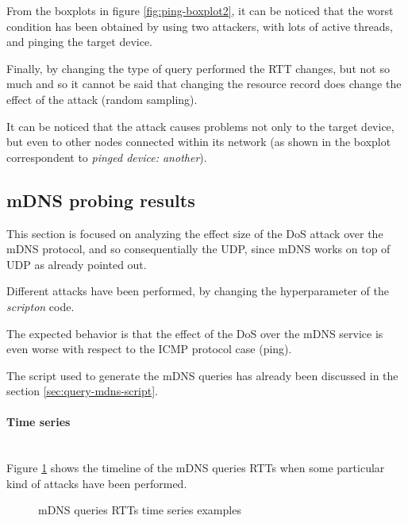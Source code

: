 \documentclass[fleqn, 11pt]{SelfArx} %
\begin{document}
From the boxplots in figure \ref{fig:ping-boxplot2}, it can be noticed that the worst condition has been obtained by using two attackers, with lots of active threads, and pinging the target device.

Finally, by changing the type of query performed the RTT changes, but not so much and so it cannot be said that changing the resource record does change the effect of the attack (random sampling).

It can be noticed that the attack causes problems not only to the target device, but even to other nodes connected within its network  (as shown in the boxplot correspondent to {\it{pinged device: another}}).
\subsection{mDNS probing results}
This section is focused on analyzing the effect size of the DoS attack over the mDNS protocol, and so consequentially the UDP, since mDNS works on top of UDP as already pointed out.

Different attacks have been performed, by changing the hyperparameter of the {\it{scripton}} code.

The expected behavior is that the effect of the DoS over the mDNS service is even worse with respect to the ICMP protocol case (ping).

The script used to generate the mDNS queries has already been discussed in the section \ref{sec:query-mdns-script}.
\paragraph{Time series}\mbox{}\\
Figure \ref{fig:mdns-rtts-time-series} shows the timeline of the mDNS queries RTTs when some particular kind of attacks have been performed.

\begin{figure}[H]
    \centering
    \qquad
    \caption{mDNS queries RTTs time series examples}%
    \label{fig:mdns-rtts-time-series}%
\end{figure}
\end{document}
